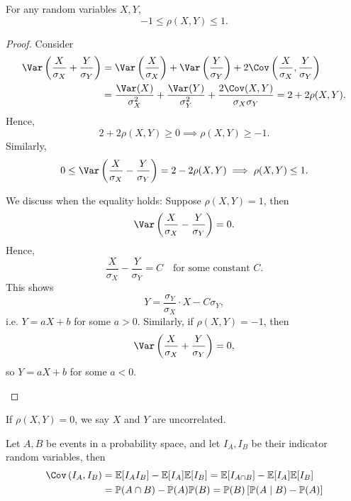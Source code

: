 \begin{proposition}
    For any random variables \(X, Y\), 
    \[
        -1 \le \rho (X, Y) \le 1.
    \] 
\end{proposition}

\begin{proof}
    Consider 
    \begin{align*}
        \Var \left( \frac{X}{\sigma _X} + \frac{Y}{\sigma _Y} \right) &= \Var \left( \frac{X}{\sigma _X} \right) + \Var \left( \frac{Y}{\sigma _Y } \right) + 2 \Cov \left( \frac{X}{\sigma _X}, \frac{Y}{\sigma _Y} \right) \\
        &= \frac{\Var(X)}{\sigma _X^2} + \frac{\Var(Y)}{\sigma _Y^2} + \frac{2 \Cov(X, Y)}{\sigma _X \sigma _Y} = 2 + 2 \rho (X, Y).   
    \end{align*}
    Hence, 
    \[
        2 + 2 \rho (X, Y) \ge 0 \implies \rho (X, Y) \ge -1.
    \]
    Similarly, 
    \[
        0 \le \Var \left( \frac{X}{\sigma _X} - \frac{Y}{\sigma _Y} \right) = 2 - 2 \rho (X, Y) \implies \rho (X, Y) \le 1. 
    \]
    \begin{remark}
        We discuss when the equality holds: Suppose \(\rho (X, Y) = 1\), then 
        \[
            \Var \left( \frac{X}{\sigma _X} - \frac{Y}{\sigma _Y} \right) = 0. 
        \]
        Hence,
        \[
            \frac{X}{\sigma _X} - \frac{Y}{\sigma _Y} = C \quad \text{for some constant } C. 
        \]
        This shows 
        \[
            Y = \frac{\sigma _Y}{\sigma _X} \cdot X - C \sigma _Y,
        \]
        i.e. \(Y = a X + b\) for some \(a > 0\). Similarly, if \(\rho (X, Y) = -1\), then 
        \[
            \Var \left( \frac{X}{\sigma _X} + \frac{Y}{\sigma _Y} \right) = 0, 
        \]   
        so \(Y = aX + b\) for some \(a < 0\).  
    \end{remark}
\end{proof}

\begin{definition}
    If \(\rho (X, Y) = 0\), we say \(X\) and \(Y\) are uncorrelated.    
\end{definition}

\begin{eg}
    Let \(A, B\) be events in a probability space, and let \(I_A, I_B\) be their indicator random variables, then 
    \begin{align*}
        \Cov \left( I_A, I_B \right) &= \mathbb{E} [I_A I_B] - \mathbb{E} [I_A] \mathbb{E} [I_B] = \mathbb{E} [I_{A \cap B}] - \mathbb{E} [I_A] \mathbb{E} [I_B] \\
        &= \mathbb{P} (A \cap B) - \mathbb{P} (A) \mathbb{P} (B) = \mathbb{P} (B) \left[ \mathbb{P} (A \mid B) - \mathbb{P} (A) \right]  
    \end{align*} 
\end{eg}